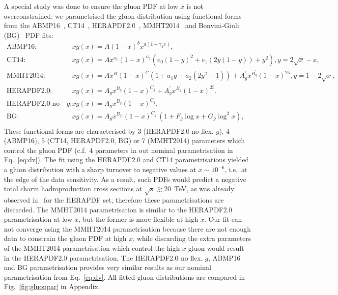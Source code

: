 \documentclass[12pt]{article}
\begin{document}
A special study was done to ensure the gluon PDF at low $x$ is not overconstrained: we parametrised the gluon distribution using functional forms from the ABMP16~\cite{Alekhin:2017kpj}, CT14~\cite{Dulat:2015mca}, HERAPDF2.0~\cite{Abramowicz:2015mha}, MMHT2014~\cite{Harland-Lang:2014zoa} and Bonvini-Giuli (BG)~\cite{Bonvini:2019wxf} PDF fits:
\begin{equation}
\begin{aligned}
\textrm{ABMP16:}~~~~~~ &xg(x)=A (1 - x)^b x^{a (1 + \gamma_{1} x)},\\
\textrm{CT14:}~~~~~~ &xg(x) = Ax^{a_1}(1-x)^{a_2}(e_0(1-y)^2+e_1(2y(1-y))+y^2), y=2\sqrt{x}-x,\\
\textrm{MMHT2014:}~~~~~~ &xg(x) = Ax^B(1-x)^C(1+a_1y+a_2(2y^2-1))+A^{\prime}_gx^{B^{\prime}_g}(1-x)^{25}, y=1-2\sqrt{x},\\ 
\textrm{HERAPDF2.0:}~~~~~~ &xg(x)=A_gx^{B_g}(1-x)^{C_g}+A^{\prime}_gx^{B^{\prime}_g}(1-x)^{25},\\
\textrm{HERAPDF2.0 no flex. $g$:}~~~~~~ &xg(x)=A_gx^{B_g}(1-x)^{C_g},\\
\textrm{BG:}~~~~~~ &xg(x)=A_{g} x^{B_{g}}\,(1-x)^{C_{g}}\, (1 + F_{g} {\log x} + G_{g} {\log^2 x}),\\
\end{aligned}
\label{eq:gluonpar}
\end{equation}
These functional forms are characterised by $3$ (HERAPDF2.0 no flex. $g$), $4$ (ABMP16), $5$ (CT14, HERAPDF2.0, BG) or $7$ (MMHT2014) parameters which control the gluon PDF (c.f.\ $4$ parameters in out nominal parametrisation in Eq.~\ref{eq:dv}). The fit using the HERAPDF2.0 and CT14 parametrisations yielded a gluon distribution with a sharp turnover to negative values at $x \sim 10^{-6}$, i.e.\ at the edge of the data sensitivity. As a result, such PDFs would predict a negative total charm hadroproduction cross sections at $\sqrt{s} \gtrsim 20$~TeV, as was already observed in~\cite{Accardi:2016ndt} for the HERAPDF set, therefore these parametrisations are discarded. The MMHT2014 parametrisation is similar to the HERAPDF2.0 parametrisation at low $x$, but the former is more flexible at high $x$. Our fit can not converge using the MMHT2014 parametrisation because there are not enough data to constrain the gluon PDF at high $x$, while discarding the extra parameters of the MMHT2014 parametrisation which control the high-$x$ gluon would result in the HERAPDF2.0 parametrisation. The HERAPDF2.0 no flex. $g$, ABMP16 and BG parametrisation provides very similar results as our nominal parametrisation from Eq.~\ref{eq:dv}. All fitted gluon distributions are compared in Fig.~\ref{fig:gluonpar} in Appendix.
\end{document}
